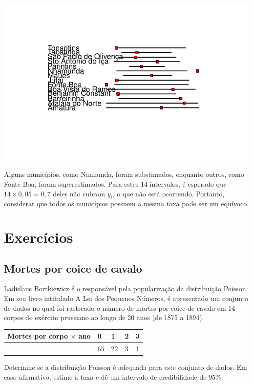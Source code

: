 \documentclass[
  letterpaper,
  DIV=11,
  numbers=noendperiod]{scrreprt}
\theoremstyle{plain}
\theoremstyle{definition}
\theoremstyle{definition}
\theoremstyle{remark}
\begin{document}
\includegraphics{poisson_files/figure-pdf/unnamed-chunk-7-1.pdf}

Alguns municípios, como Nanhunda, foram substimados, enquanto outros,
como Fonte Boa, foram superestimados. Para estes 14 intervalos, é
esperado que \(14\times 0,05=0,7\) deles não cubram \(y_i\), o que não
está ocorrendo. Portanto, considerar que todos os municípios possuem a
mesma taxa pode ser um equívoco.

\section{Exercícios}\label{exercuxedcios-3}

\subsection{Mortes por coice de
cavalo}\label{mortes-por-coice-de-cavalo-1}

Ladislaus Bortkiewicz é o responsável pela popularização da distribuição
Poisson. Em seu livro intitulado A Lei dos Pequenos Números, é
apresentado um conjunto de dados no qual foi rastreado o número de
mortes por coice de cavalo em 14 corpos do exército prussiano ao longo
de 20 anos (de 1875 a 1894).

\begin{longtable}[]{@{}lllll@{}}
\toprule\noalign{}
Mortes por corpo \(\times\) ano & 0 & 1 & 2 & 3 \\
\midrule\noalign{}
\endhead
\bottomrule\noalign{}
\endlastfoot
109 & 65 & 22 & 3 & 1 \\
\end{longtable}

Determine se a distribuição Poisson é adequada para este conjunto de
dados. Em caso afirmativo, estime a taxa e dê um intervalo de
credibilidade de 95\%.
\end{document}
